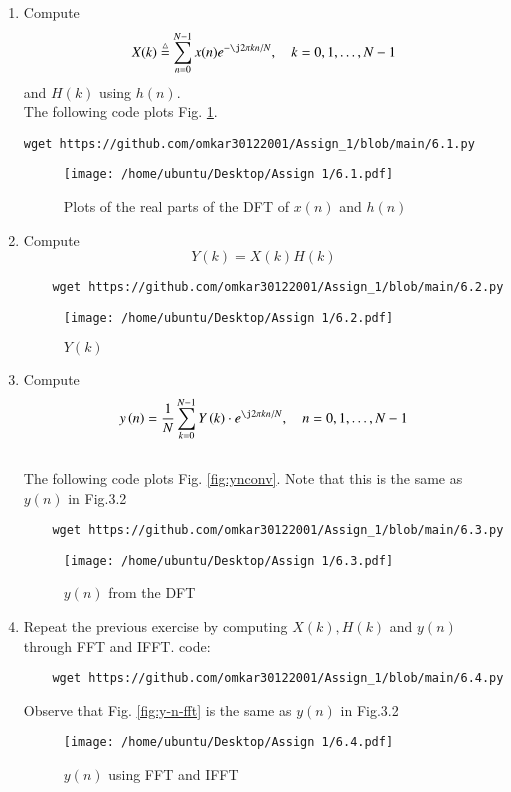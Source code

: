 \documentclass[journal,12pt,twocolumn]{IEEEtran}
\renewcommand\thesection{\arabic{section}}
\begin{document}
\begin{enumerate}[label=\thesection.\arabic*
	,ref=\thesection.\theenumi]
	\item
Compute
\begin{equation}
	X(k) \define \sum _{n=0}^{N-1}x(n) e^{-\j2\pi kn/N}, \quad k = 0,1,\dots, N-1
\end{equation}
and $H(k)$ using $h(n)$.\\
\solution The following code plots Fig. \ref{fig:6.1}.
\begin{lstlisting}
wget https://github.com/omkar30122001/Assign_1/blob/main/6.1.py
\end{lstlisting}
\begin{figure}[!ht]
	\centering
	\texttt{[image: /home/ubuntu/Desktop/Assign 1/6.1.pdf]}
	\caption{Plots of the real parts of the DFT of $x(n)$ and $h(n)$}
	\label{fig:6.1}
\end{figure}
	
\item Compute 
\begin{equation}\label{6.2}
	Y(k) = X(k)H(k)
\end{equation}
\solution 
\begin{lstlisting}
	wget https://github.com/omkar30122001/Assign_1/blob/main/6.2.py
\end{lstlisting}
\begin{figure}[!ht]
	\centering
	\texttt{[image: /home/ubuntu/Desktop/Assign 1/6.2.pdf]}
	\caption{$Y(k)$}
\end{figure}
\item Compute
\begin{equation} \label{6.3}
	y\brak{n}={\frac {1}{N}}\sum _{k=0}^{N-1}Y\brak{k}\cdot e^{\j 2\pi kn/N},\quad n = 0,1,\dots, N-1
\end{equation}
\\
\solution The following code plots Fig. \ref{fig:ynconv}. Note that this is the same as 
	$y(n)$ in  Fig.3.2 
%
\begin{lstlisting}
	wget https://github.com/omkar30122001/Assign_1/blob/main/6.3.py
\end{lstlisting}
	
\begin{figure}[!ht]
	\centering
	\texttt{[image: /home/ubuntu/Desktop/Assign 1/6.3.pdf]}
	\caption{$y(n)$ from the DFT}
	\label{fig:yndft}
\end{figure}
	
\item Repeat the previous exercise by computing $X(k), H(k)$ and $y(n)$ through FFT and 
IFFT.
\solution code:
\begin{lstlisting}
	wget https://github.com/omkar30122001/Assign_1/blob/main/6.4.py
\end{lstlisting}
Observe that Fig. \eqref{fig:y-n-fft} is the same as $y(n)$ in Fig.3.2
\begin{figure}
	\centering
	\texttt{[image: /home/ubuntu/Desktop/Assign 1/6.4.pdf]}
	\caption{$y(n)$ using FFT and IFFT}
	\label{fig:y-n-fft}
\end{figure}
%

\end{enumerate}
\end{document}
